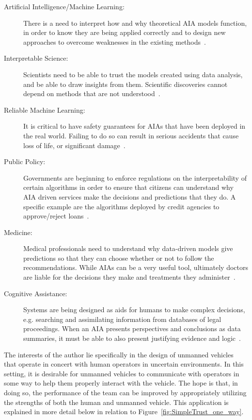     \begin{description}
        \item [Artificial Intelligence/Machine Learning:] There is a need to interpret how and why theoretical AIA models function, in order to know they are being applied correctly and to design new approaches to overcome weaknesses in the existing methods~\cite{Garcia2015-rs,Otte2013-oo}.    
        \item [Interpretable Science:] Scientists need to be able to trust the models created using data analysis, and be able to draw insights from them. Scientific discoveries cannot depend on methods that are not understood~\cite{Faghmous2014-og}.
        \item [Reliable Machine Learning:] It is critical to have safety guarantees for AIAs that have been deployed in the real world. Failing to do so can result in serious accidents that cause loss of life, or significant damage~\cite{Sugiyama2013-ci,Amodei2016-xi}.       
        \item [Public Policy:] Governments are beginning to enforce regulations on the interpretability of certain algorithms in order to ensure that citizens can understand why AIA driven services make the decisions and predictions that they do. A specific example are the algorithms deployed by credit agencies to approve/reject loans~\cite{Wagner2016-ck}.
        \item [Medicine:] Medical professionals need to understand why data-driven models give predictions so that they can choose whether or not to follow the recommendations. While AIAs can be a very useful tool, ultimately doctors are liable for the decisions they make and treatments they administer~\cite{Jovanovic2016-gw}.
        \item [Cognitive Assistance:] Systems are being designed as aids for humans to make complex decisions, e.g. searching and assimilating information from databases of legal proceedings. When an AIA presents perspectives and conclusions as data summaries, it must be able to also present justifying evidence and logic~\cite{Gutfreund2016-xe}.
    \end{description}

    The interests of the author lie specifically in the design of unmanned vehicles that operate in concert with human operators in uncertain environments. In this setting, it is desirable for unmanned vehicles to communicate with operators in some way to help them properly interact with the vehicle. The hope is that, in doing so, the performance of the team can be improved by appropriately utilizing the strengths of both the human and unmanned vehicle. This application is explained in more detail below in relation to Figure~\ref{fig:SimpleTrust_one_way}.

